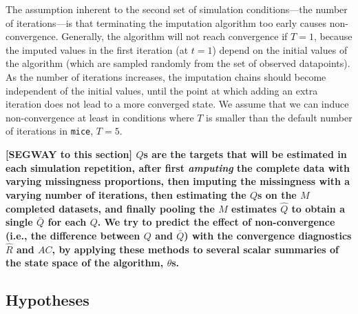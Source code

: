 \documentclass[Royal,times,sageh]{sagej}
\begin{document}
The assumption inherent to the second set of simulation conditions---the number of iterations---is that terminating the imputation algorithm too early causes non-convergence. Generally, the algorithm will not reach convergence if \(T=1\), because the imputed values in the first iteration (at \(t=1\)) depend on the initial values of the algorithm (which are sampled randomly from the set of observed datapoints). As the number of iterations increases, the imputation chains should become independent of the initial values, until the point at which adding an extra iteration does not lead to a more converged state. We assume that we can induce non-convergence at least in conditions where \(T\) is smaller than the default number of iterations in \texttt{mice}, \(T=5\).

\textbf{{[}SEGWAY to this section{]} \(Q\)s are the targets that will be estimated in each simulation repetition, after first \emph{amputing} the complete data with varying missingness proportions, then imputing the missingness with a varying number of iterations, then estimating the \(Q\)s on the \(M\) completed datasets, and finally pooling the \(M\) estimates \(\hat{Q}\) to obtain a single \(\bar{Q}\) for each \(Q\). We try to predict the effect of non-convergence (i.e., the difference between \(Q\) and \(\bar{Q}\)) with the convergence diagnostics \(\widehat{R}\) and \(AC\), by applying these methods to several scalar summaries of the state space of the algorithm, \(\theta\)s.}

\hypertarget{hypotheses}{%
\subsection{Hypotheses}\label{hypotheses}}
\end{document}
